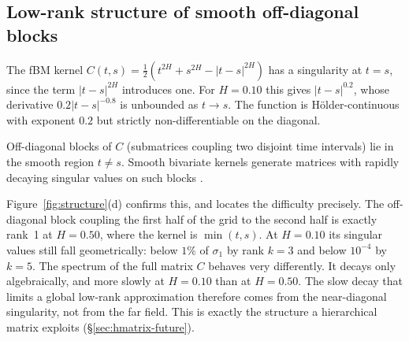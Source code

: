 \subsection{Low-rank structure of smooth off-diagonal blocks}
\label{sec:lowrank}

The fBM kernel $C(t,s) = \tfrac{1}{2}(t^{2H}+s^{2H}-|t-s|^{2H})$ has a singularity at $t = s$, 
since the term $|t-s|^{2H}$ introduces one. For $H = 0.10$ this gives $|t-s|^{0.2}$, whose derivative
$0.2|t-s|^{-0.8}$ is unbounded as $t \to s$. The function is H\"older-continuous
with exponent $0.2$ but strictly non-differentiable on the diagonal.

Off-diagonal blocks of $C$ (submatrices coupling two disjoint time intervals) lie
in the smooth region $t \neq s$.  Smooth bivariate kernels generate matrices with
rapidly decaying singular values on such blocks \citep{candes2009fast}.

Figure~\ref{fig:structure}(d) confirms this, and locates the difficulty precisely.
The off-diagonal block coupling the first half of the grid to the second half is
exactly rank~1 at $H = 0.50$, where the kernel is $\min(t,s)$.  At $H = 0.10$ its
singular values still fall geometrically: below $1\%$ of $\sigma_1$ by rank $k = 3$
and below $10^{-4}$ by $k = 5$.  The spectrum of the full matrix $C$ behaves very
differently.  It decays only algebraically, and more slowly at $H = 0.10$ than at
$H = 0.50$.  The slow decay that limits a global low-rank approximation therefore
comes from the near-diagonal singularity, not from the far field.  This is exactly
the structure a hierarchical matrix exploits (§\ref{sec:hmatrix-future}).